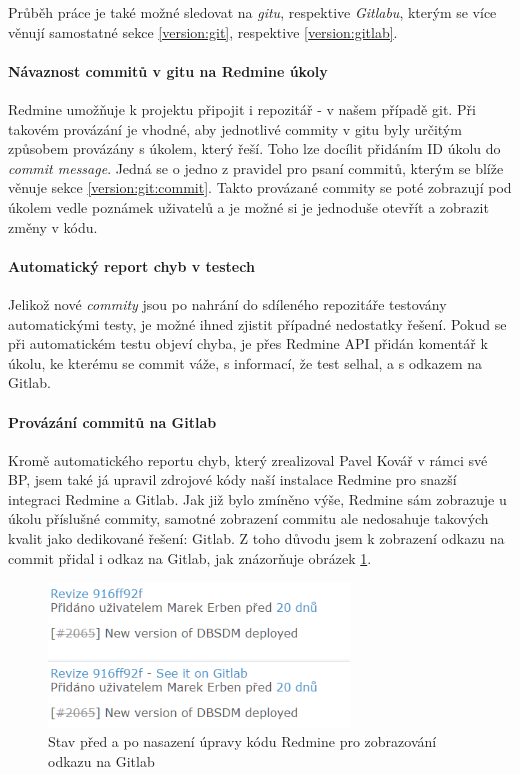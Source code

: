 Průběh práce je také možné sledovat na \emph{gitu}, respektive \emph{Gitlabu}, kterým se více věnují samostatné sekce \ref{version:git}, respektive \ref{version:gitlab}.

\paragraph{Návaznost commitů v gitu na Redmine úkoly} \label{redmine:commitlink}
Redmine umožňuje k projektu připojit i repozitář - v našem případě git. Při takovém provázání je vhodné, aby jednotlivé commity v gitu byly určitým způsobem provázány s úkolem, který řeší. Toho lze docílit přidáním ID úkolu do \emph{commit message}. Jedná se o jedno z pravidel pro psaní commitů, kterým se blíže věnuje sekce \ref{version:git:commit}. Takto provázané commity se poté zobrazují pod úkolem vedle poznámek uživatelů a je možné si je jednoduše otevřít a zobrazit změny v kódu.

\paragraph{Automatický report chyb v testech} \label{redmine:CI_report}
Jelikož nové \emph{commity} jsou po nahrání do sdíleného repozitáře testovány automatickými testy, je možné ihned zjistit případné nedostatky řešení. Pokud se při automatickém testu objeví chyba, je přes Redmine API přidán komentář k úkolu, ke kterému se commit váže, s informací, že test selhal, a s odkazem na Gitlab.

\paragraph{Provázání commitů na Gitlab}
Kromě automatického reportu chyb, který zrealizoval Pavel Kovář v rámci své BP, jsem také já upravil zdrojové kódy naší instalace Redmine pro snazší integraci Redmine a Gitlab. Jak již bylo zmíněno výše, Redmine sám zobrazuje u úkolu příslušné commity, samotné zobrazení commitu ale nedosahuje takových kvalit jako dedikované řešení: Gitlab. Z toho důvodu jsem k zobrazení odkazu na commit přidal i odkaz na Gitlab, jak znázorňuje obrázek \ref{picture:redmineTOgitlab}.
\begin{figure}[h]
\includegraphics[width=8cm]{../png/redmineTOgitlab.png}
\caption{Stav před a po nasazení úpravy kódu Redmine pro zobrazování odkazu na Gitlab} \label{picture:redmineTOgitlab}
\end{figure}

